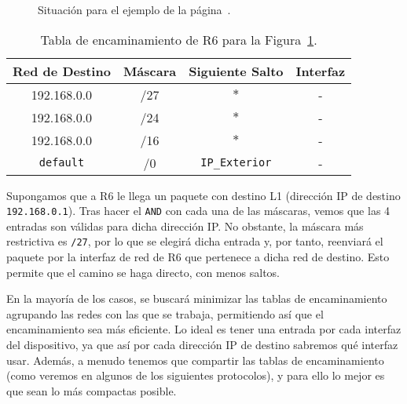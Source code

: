 \begin{ejemplo}
\begin{figure}
{}
        \caption{Situación para el ejemplo de la página~\pageref{ejemplo:tabla_encaminamiento}.}
        \label{fig:ejemplo_tabla_encaminamiento}
    \end{figure}
    \begin{table}
        \centering
        \begin{tabular}{|c|c|c|c|}
            \hline
            {Red de Destino} & {Máscara} & {Siguiente Salto} & {Interfaz}\\ \hline
            192.168.0.0 & {\color{red}/27} & $*$ & {\color{red}-}\\
            192.168.0.0 & {\color{olive}/24} & $*$ & {\color{olive}-}\\
            192.168.0.0 & {\color{blue}/16} & $*$ & {\color{blue}-}\\
            \verb|default| & {/0} & \verb|IP_Exterior| & -\\
            \hline
        \end{tabular}
        \caption{Tabla de encaminamiento de R6 para la Figura~\ref{fig:ejemplo_tabla_encaminamiento}.}
        \label{tab:encaminamientoR6}
    \end{table}

    Supongamos que a R6 le llega un paquete con destino L1 (dirección IP de destino \verb|192.168.0.1|). Tras hacer el \verb|AND| con cada una de las máscaras, vemos que las 4 entradas son válidas para dicha dirección IP\@. No obstante, la máscara más restrictiva es \verb|/27|, por lo que se elegirá dicha entrada y, por tanto, reenviará el paquete por la interfaz de red de R6 que pertenece a dicha red de destino. Esto permite que el camino se haga directo, con menos saltos.
\end{ejemplo}

En la mayoría de los casos, se buscará minimizar las tablas de encaminamiento agrupando las redes con las que se trabaja, permitiendo así que el encaminamiento sea más eficiente. Lo ideal es tener una entrada por cada interfaz del dispositivo, ya que así por cada dirección IP de destino sabremos qué interfaz usar. Además, a menudo tenemos que compartir las tablas de encaminamiento (como veremos en algunos de los siguientes protocolos), y para ello lo mejor es que sean lo más compactas posible.

